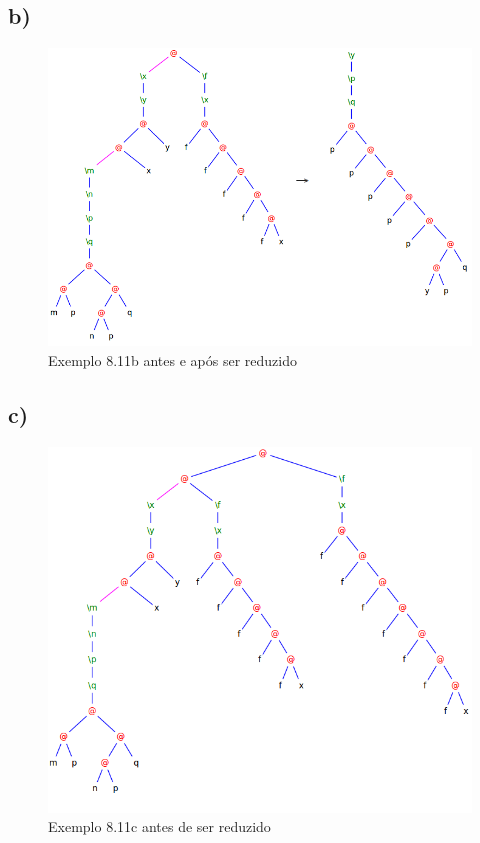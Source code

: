 \documentclass[a4paper]{article}
\begin{document}
\FloatBarrier
\subsection*{b)}

\begin{figure}[h]
  \centering
  \includegraphics[scale=0.5]{8-11_b.png}
  \caption{Exemplo 8.11b antes e após ser reduzido}
\end{figure}

\FloatBarrier

\subsection*{c)}

\begin{figure}[h]
  \centering
  \includegraphics[scale=0.5]{8-11c_1.png}
  \caption{Exemplo 8.11c antes de ser reduzido}
\end{figure}
\end{document}

